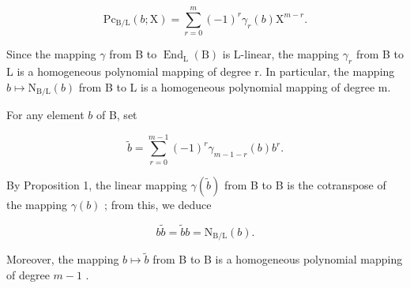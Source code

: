 \[
\mathrm{Pc} _ {\mathrm{B/L}} (b; \mathrm{X}) = \sum_ {r = 0} ^ {m} (- 1) ^ {r} \gamma_ {r} (b) \mathrm{X} ^ {m - r}.\tag{16}
\]

Since the mapping \(\gamma\) from B to \(\operatorname{End}_{\mathrm{L}}(\mathrm{B})\) is L-linear, the mapping \(\gamma_{r}\) from B to L is a homogeneous polynomial mapping of degree r. In particular, the mapping \(b \mapsto \mathrm{N}_{\mathrm{B}/\mathrm{L}}(b)\) from B to L is a homogeneous polynomial mapping of degree m.

For any element \(b\) of B, set

\[
\widetilde {b} = \sum_ {r = 0} ^ {m - 1} (- 1) ^ {r} \gamma_ {m - 1 - r} (b) b ^ {r}.\tag{17}
\]

By Proposition 1, the linear mapping \(\gamma (\widetilde{b})\) from B to B is the cotranspose of the mapping \(\gamma (b)\) ; from this, we deduce

\[
b \widetilde {b} = \widetilde {b} b = \mathrm{N} _ {\mathrm{B/L}} (b).\tag{18}
\]

Moreover, the mapping \(b \mapsto \widetilde{b}\) from B to B is a homogeneous polynomial mapping of degree \(m - 1\) .

